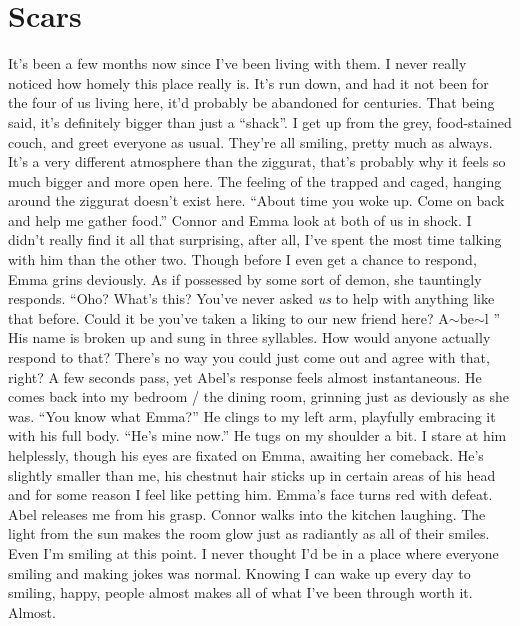 \documentclass[openany, 12pt]{book}
\newcommand\tab[1][1cm]{\hspace*{#1}}
\begin{document}
\chapter{Scars}
\tab
It’s been a few months now since I’ve been living with them. I never really noticed how homely this place really is. It’s run down, and had it not been for the four of us living here, it’d probably be abandoned for centuries. That being said, it’s definitely bigger than just a “shack”. I get up from the grey, food-stained couch, and greet everyone as usual. They’re all smiling, pretty much as always. It’s a very different atmosphere than the ziggurat, that’s probably why it feels so much bigger and more open here. The feeling of the trapped and caged, hanging around the ziggurat doesn't exist here.\newline
\tab
``About time you woke up. Come on back and help me gather food.'' Connor and Emma look at both of us in shock. I didn’t really find it all that surprising, after all, I’ve spent the most time talking with him than the other two. Though before I even get a chance to respond, Emma grins deviously.\newline
\tab
As if possessed by some sort of demon, she tauntingly responds. ``Oho? What’s this? You’ve never asked \textit{us} to help with anything like that before. Could it be you’ve taken a liking to our new friend here? A$\sim$be$\sim$l \musEighth '' His name is broken up and sung in three syllables.\newline
\tab
How would anyone actually respond to that? There’s no way you could just come out and agree with that, right? A few seconds pass, yet Abel’s response feels almost instantaneous. He comes back into my bedroom / the dining room, grinning just as deviously as she was. ``You know what Emma?'' He clings to my left arm, playfully embracing it with his full body. ``He’s mine now.'' He tugs on my shoulder a bit. I stare at him helplessly, though his eyes are fixated on Emma, awaiting her comeback. He’s slightly smaller than me, his chestnut hair sticks up in certain areas of his head and for some reason I feel like petting him. \newline
\tab
Emma’s face turns red with defeat. Abel releases me from his grasp. Connor walks into the kitchen laughing. The light from the sun makes the room glow just as radiantly as all of their smiles. Even I’m smiling at this point. I never thought I’d be in a place where everyone smiling and making jokes was normal. Knowing I can wake up every day to smiling, happy, people almost makes all of what I’ve been through worth it. Almost.\newline
\end{document}
